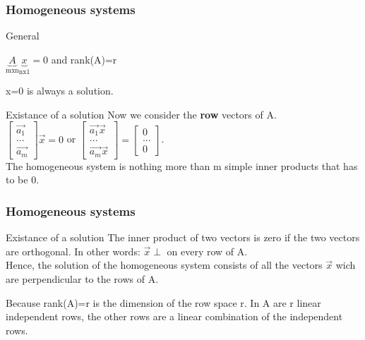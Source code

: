 \begin{frame}
	\frametitle{Homogeneous systems}
	\begin{block}{General}
		\begin{center}
			$\underbrace{A}_\text{mxn}\underbrace{x}_\text{nx1}=0$ and rank(A)=r
		\end{center}
		\begin{center}
			 x=0 is always a solution.
		\end{center}
	\end{block}
	\begin{block}{Existance of a solution}
		Now we consider the \textbf{row} vectors of A.\\
		$\begin{bmatrix}
		\overrightarrow{a_1}\\...\\\overrightarrow{a_m}
		\end{bmatrix}\overrightarrow{x}=0$ or $\begin{bmatrix}
		\overrightarrow{a_1}\overrightarrow{x}\\...\\\overrightarrow{a_m}\overrightarrow{x}
		\end{bmatrix}=\begin{bmatrix}
		0\\...\\0
		\end{bmatrix}$.\\
		The homogeneous system is nothing more than m simple inner products that has to be 0. 
	\end{block}
\end{frame}

\begin{frame}
	\frametitle{Homogeneous systems}
	\begin{block}{Existance of a solution}
		The inner product of two vectors is zero if the two vectors are orthogonal. In other words: $\overrightarrow{x} \perp $ on every row of A. \\
		Hence, the solution of the homogeneous system consists of all the vectors $\overrightarrow{x}$ wich are perpendicular to the rows of A. \vspace{4mm}
		
		Because rank(A)=r is the dimension of the row space r. In A are r linear independent rows, the other rows are a linear combination of the independent rows.
	\end{block}
\end{frame}

